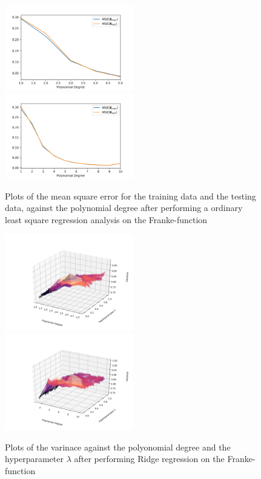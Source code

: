 \documentclass[a4paper,10pt,english]{article}
\begin{document}
\begin{figure}[H]
	\centering 
	\includegraphics[width = 0.5\textwidth, center]{../franke_output/part_C_2.png}
	\includegraphics[width = 0.5\textwidth, center]{../franke_output/part_C_2_highdeg.png}
	\caption{
		Plots of the mean square error for the training data and the testing data, against the polynomial degree after performing a ordinary least square regression analysis on the Franke-function
	}
	\label{part_c2}
\end{figure}





\begin{figure}[H]
	\centering 
	\includegraphics[width = 0.5\textwidth, center]{../franke_output/part_D_1.png}
	\includegraphics[width = 0.5\textwidth, center]{../franke_output/part_D_1_highdeg.png}
	\caption{
		Plots of the varinace against the polyonomial degree and the hyperparameter $\lambda$ after performing Ridge regression on the Franke-function
	}
	\label{part_d1}
\end{figure}
\end{document}
